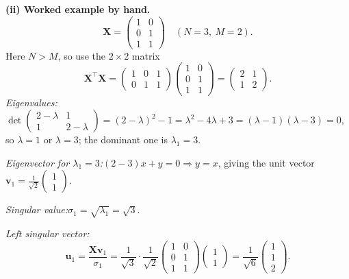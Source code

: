 \documentclass[12pt,a4paper]{article}
\theoremstyle{definition}
\newcommand{\Xb}{\mathbf{X}}
\newcommand{\vv}{\mathbf{v}}
\newcommand{\uu}{\mathbf{u}}
\newcommand{\T}{^{\!\top}}
\begin{document}
\textbf{(ii) Worked example by hand.}
\[
\Xb=\begin{pmatrix}1&0\\0&1\\1&1\end{pmatrix}\quad(N=3,\ M=2).
\]
Here $N>M$, so use the $2\times2$ matrix
\[
\Xb\T\Xb=\begin{pmatrix}1&0&1\\0&1&1\end{pmatrix}
\begin{pmatrix}1&0\\0&1\\1&1\end{pmatrix}
=\begin{pmatrix}2&1\\1&2\end{pmatrix}.
\]
\emph{Eigenvalues:}\quad
$\det\!\begin{pmatrix}2-\lambda&1\\1&2-\lambda\end{pmatrix}=(2-\lambda)^2-1
=\lambda^2-4\lambda+3=(\lambda-1)(\lambda-3)=0,$
so $\lambda=1$ or $\lambda=3$; the dominant one is $\lambda_1=3$.

\emph{Eigenvector for $\lambda_1=3$:}\quad $(2-3)x+y=0\Rightarrow y=x$, giving the
unit vector $\displaystyle\vv_1=\tfrac{1}{\sqrt2}\begin{pmatrix}1\\1\end{pmatrix}.$

\emph{Singular value:}\quad $\sigma_1=\sqrt{\lambda_1}=\sqrt3.$

\emph{Left singular vector:}\quad
\[
\uu_1=\frac{\Xb\vv_1}{\sigma_1}
=\frac{1}{\sqrt3}\cdot\frac{1}{\sqrt2}\begin{pmatrix}1&0\\0&1\\1&1\end{pmatrix}\!\begin{pmatrix}1\\1\end{pmatrix}
=\frac{1}{\sqrt6}\begin{pmatrix}1\\1\\2\end{pmatrix}.
\]
\end{document}
